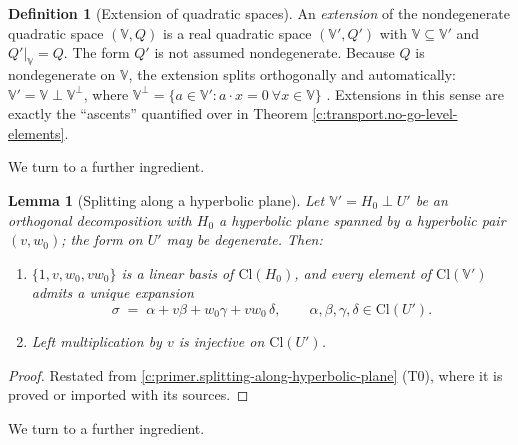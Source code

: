\documentclass[11pt]{article}
\newtheorem{lemma}[theorem]{Lemma}
\theoremstyle{definition}
\newtheorem{definition}[theorem]{Definition}
\theoremstyle{plain}
\newcommand{\changedmark}[2]{\marginpar{\raggedright\scriptsize\color{#1}#2}}
\providecommand{\Cl}{}\renewcommand{\Cl}{\mathrm{Cl}}
\begin{document}
\begin{definition}[Extension of quadratic spaces]\label{c:obj.transport.extension-quadratic-spaces}
An \emph{extension} of the nondegenerate quadratic space $(\mathbb{V}, Q)$ is a real quadratic space $(\mathbb{V}', Q')$ with $\mathbb{V} \subseteq \mathbb{V}'$ and $Q'|_{\mathbb{V}} = Q$. The form $Q'$ is not assumed nondegenerate. Because $Q$ is nondegenerate on $\mathbb{V}$, the extension splits orthogonally and automatically: $\mathbb{V}' = \mathbb{V} \perp \mathbb{V}^{\perp}$, where $\mathbb{V}^{\perp} = \{ a \in \mathbb{V}' : a \cdot x = 0 \ \forall x \in \mathbb{V}\}$ \cite{Lam2005}. Extensions in this sense are exactly the ``ascents'' quantified over in Theorem \ref{c:transport.no-go-level-elements}.
\end{definition}

We turn to a further ingredient.

\begin{lemma}[Splitting along a hyperbolic plane]\label{c:transport.splitting-along-hyperbolic-plane}
\changedmark{gray}{reworded}
Let $\mathbb{V}' = H_0 \perp U'$ be an orthogonal decomposition with $H_0$ a hyperbolic plane spanned by a hyperbolic pair $(v, w_0)$; the form on $U'$ may be degenerate. Then:
\begin{enumerate}
\item $\{1, v, w_0, v w_0\}$ is a linear basis of $\Cl(H_0)$, and every element of $\Cl(\mathbb{V}')$ admits a \emph{unique} expansion
\[
\sigma \;=\; \alpha + v\beta + w_0\gamma + v w_0\,\delta, \qquad \alpha, \beta, \gamma, \delta \in \Cl(U').
\]
\item Left multiplication by $v$ is injective on $\Cl(U')$.
\end{enumerate}
\end{lemma}
\begin{proof}
Restated from \ref{c:primer.splitting-along-hyperbolic-plane} (T0), where it is proved or imported with its sources.

\end{proof}

We turn to a further ingredient.
\end{document}
